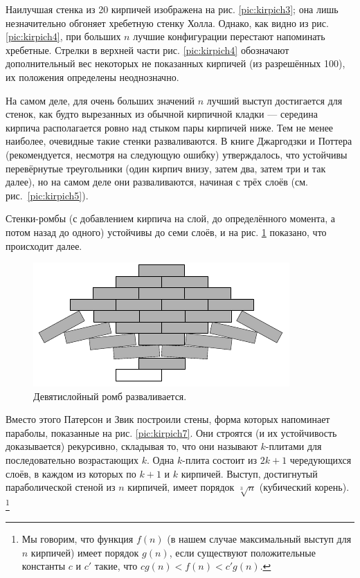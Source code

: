 Наилучшая стенка из 20 кирпичей изображена на рис. \ref{pic:kirpich3};
она лишь незначительно обгоняет хребетную стенку Холла.
Однако, как видно из рис. \ref{pic:kirpich4},  при больших $n$ лучшие конфигурации перестают напоминать хребетные.
Стрелки в верхней части рис. \ref{pic:kirpich4} обозначают дополнительный вес некоторых не показанных кирпичей (из разрешённых 100), их положения определены неоднозначно.

На самом деле, для очень больших значений $n$ лучший выступ достигается для стенок, как будто вырезанных из обычной кирпичной кладки --- середина кирпича располагается ровно над стыком пары кирпичей ниже.
Тем не менее наиболее, очевидные такие стенки разваливаются.
В книге Джаргодзки и Поттера \cite{38} (рекомендуется, несмотря на следующую ошибку) утверждалось, что устойчивы перевёрнутые треугольники (один кирпич внизу, затем два, затем три и так далее), но на самом деле они разваливаются, начиная с трёх слоёв (см. рис.~\ref{pic:kirpich5}).  

Стенки-ромбы (с добавлением кирпича на слой, до определённого момента, а потом назад до одного) устойчивы до семи слоёв, и на рис. \ref{pic:kirpich6} показано, что происходит далее.

\begin{figure}[htb!]
\centering
\includegraphics[scale=1]{pics/kirpich6}
\caption{Девятислойный ромб разваливается.}
\label{pic:kirpich6}
\end{figure}

Вместо этого Патерсон и Звик построили стены, форма которых напоминает параболы, показанные на рис. \ref{pic:kirpich7}.
Они строятся (и их устойчивость доказывается) рекурсивно, складывая то, что они называют $k$-плитами для последовательно возрастающих $k$.
Одна $k$-плита состоит из $2k + 1$ чередующихся слоёв, в каждом из которых по $k + 1$ и $k$ кирпичей.
Выступ, достигнутый параболической стеной из $n$ кирпичей, имеет порядок $\sqrt[3]{n}$ (кубический корень).%
\footnote{Мы говорим, что функция $f (n)$ (в нашем случае максимальный выступ для $n$ кирпичей) имеет порядок $g(n)$, если существуют положительные константы $c$ и $c'$ такие, что $c g(n) < f (n) < c' g(n)$.}

